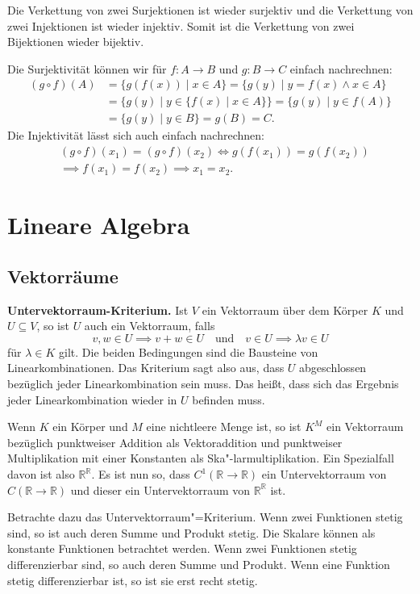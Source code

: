 \documentclass[a4paper,11pt,fleqn,twoside]{scrartcl}
\numberwithin{equation}{section}
\newcommand{\R}{\mathbb R}
\newcommand{\strong}[1]{{\normalfont\sffamily\bfseries #1}}
\begin{document}
Die Verkettung von zwei Surjektionen ist wieder surjektiv
und die Verkettung von zwei Injektionen ist wieder injektiv. Somit
ist die Verkettung von zwei Bijektionen wieder bijektiv.

Die Surjektivität können wir für $f\colon A\to B$ und $g\colon B\to C$
einfach nachrechnen:
\begin{align}
(g\circ f)(A) &= \{g(f(x))\mid x\in A\} = \{g(y)\mid y=f(x)\wedge x\in A\}\\
&= \{g(y)\mid y\in\{f(x)\mid x\in A\}\} = \{g(y)\mid y\in f(A)\}\\
&= \{g(y)\mid y\in B\} = g(B) = C.
\end{align}
Die Injektivität lässt sich auch einfach nachrechnen:
\begin{align}
&(g\circ f)(x_1) = (g\circ f)(x_2)
\iff g(f(x_1)) = g(f(x_2))\\
& \implies f(x_1) = f(x_2)
\implies x_1=x_2.
\end{align}

\section{Lineare Algebra}
\subsection{Vektorräume}
\strong{Untervektorraum-Kriterium.}
Ist $V$ ein Vektorraum über
dem Körper $K$ und $U\subseteq V$, so ist $U$ auch ein Vektorraum,
falls
\begin{equation}
v,w\in U\implies v+w\in U
\quad\text{und}\quad
v\in U\implies \lambda v\in U
\end{equation}
für $\lambda\in K$ gilt. Die beiden Bedingungen sind die Bausteine von
Linearkombinationen. Das Kriterium sagt also aus, dass $U$
abgeschlossen bezüglich jeder Linearkombination sein muss.
Das heißt, dass sich das Ergebnis jeder Linearkombination wieder
in $U$ befinden muss.

Wenn $K$ ein Körper und
$M$ eine nichtleere Menge ist, so ist $K^M$ ein Vektorraum bezüglich
punktweiser Addition als Vektoraddition und punktweiser Multiplikation
mit einer Konstanten als Ska"-larmultiplikation. Ein Spezialfall davon
ist also $\R^\R$. Es ist nun so, dass $C^1(\R\to\R)$ ein Untervektorraum
von $C(\R\to\R)$ und dieser ein Untervektorraum von $\R^\R$ ist.

Betrachte dazu das Untervektorraum"=Kriterium. Wenn zwei Funktionen
stetig sind, so ist auch deren Summe und Produkt stetig. Die Skalare
können als konstante Funktionen betrachtet werden. Wenn zwei
Funktionen stetig differenzierbar sind, so auch deren Summe und
Produkt. Wenn eine Funktion stetig differenzierbar ist, so ist sie
erst recht stetig.
\end{document}
